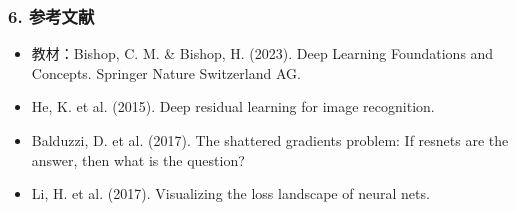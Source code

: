 \documentclass[t,aspectratio=169]{beamer} %
\begin{document}
\begin{frame}
    \frametitle{6. 参考文献}
    \begin{itemize}
        \item 教材：Bishop, C. M. \& Bishop, H. (2023). Deep Learning Foundations and Concepts. Springer Nature Switzerland AG.
        \item He, K. et al. (2015). Deep residual learning for image recognition.
        \item Balduzzi, D. et al. (2017). The shattered gradients problem: If resnets are the answer, then what is the question?
        \item Li, H. et al. (2017). Visualizing the loss landscape of neural nets.
    \end{itemize}
\end{frame}
\end{document}
